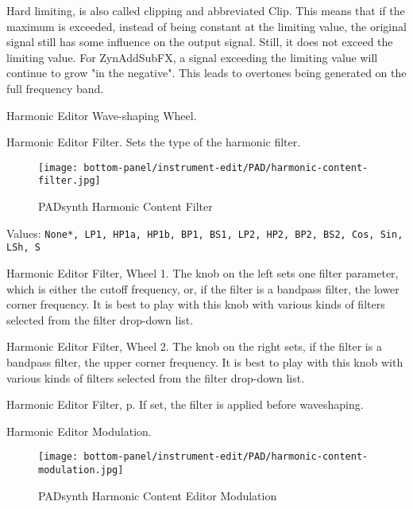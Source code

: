    Hard limiting, is also called clipping and abbreviated Clip. This means
   that if the maximum is exceeded, instead of being constant at the limiting
   value, the original signal still has some influence on the output signal.
   Still, it does not exceed the limiting value. For ZynAddSubFX, a signal
   exceeding the limiting value will continue to grow "in the negative". This
   leads to overtones being generated on the full frequency band.

   Harmonic Editor Wave-shaping Wheel.

   Harmonic Editor Filter.
   Sets the type of the harmonic filter.

\begin{figure}[H]
   \centering 
   \texttt{[image: bottom-panel/instrument-edit/PAD/harmonic-content-filter.jpg]}
   \caption{PADsynth Harmonic Content Filter}
   \label{fig:}
\end{figure}

   Values: \texttt{None*, LP1, HP1a, HP1b, BP1, BS1, LP2, HP2, BP2,
              BS2, Cos, Sin, LSh, S}

   Harmonic Editor Filter, Wheel 1.
   The knob on the left sets one filter parameter, which is either the cutoff
   frequency, or, if the filter is a bandpass filter, the lower corner
   frequency.
   It is best to play with this knob with various kinds of filters selected
   from the filter drop-down list.

   Harmonic Editor Filter, Wheel 2.
   The knob on the right sets, if the filter is a bandpass filter, the upper
   corner frequency.
   It is best to play with this knob with various kinds of filters selected
   from the filter drop-down list.

   Harmonic Editor Filter, p.
   If set, the filter is applied before waveshaping.

   Harmonic Editor Modulation.

\begin{figure}[H]
   \centering 
   \texttt{[image: bottom-panel/instrument-edit/PAD/harmonic-content-modulation.jpg]}
   \caption{PADsynth Harmonic Content Editor Modulation}
   \label{fig:padsynth_harmonic_content_editor_modulation}
\end{figure}

